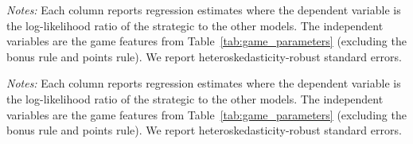 \begin{table}[h!] 
\begin{center}
\begin{minipage}{1 \linewidth}                          
\caption{Log-likelihood ratio regressions across game types ($\varepsilon = 0.2$)}  
\label{tab:game_level_eps_02}     
\centering                                            
\scriptsize
\renewcommand{\arraystretch}{1.2}

\end{minipage}
\end{center}
\begin{footnotesize}
\begin{singlespace}
\vspace*{-0.15in}
\emph{Notes:} Each column reports regression estimates where the dependent variable is the log-likelihood ratio of the strategic \aisub{} to the other models.
The independent variables are the game features from Table~\ref{tab:game_parameters} (excluding the bonus rule and points rule).
We report heteroskedasticity-robust standard errors.
\starlanguage{}
\end{singlespace}
\end{footnotesize}
\end{table}

\begin{table}[h!] 
\begin{center}
\begin{minipage}{1 \linewidth}                          
\caption{Log-likelihood ratio regressions across game types ($\varepsilon = 0.3$)}  
\label{tab:game_level_eps_03}     
\centering                                           
\scriptsize
\renewcommand{\arraystretch}{1.2}

\end{minipage}
\end{center}
\begin{footnotesize}
\begin{singlespace}
\vspace*{-0.15in}
\emph{Notes:} Each column reports regression estimates where the dependent variable is the log-likelihood ratio of the strategic \aisub{} to the other models.
The independent variables are the game features from Table~\ref{tab:game_parameters} (excluding the bonus rule and points rule).
We report heteroskedasticity-robust standard errors.
\starlanguage{}
\end{singlespace}
\end{footnotesize}
\end{table}

